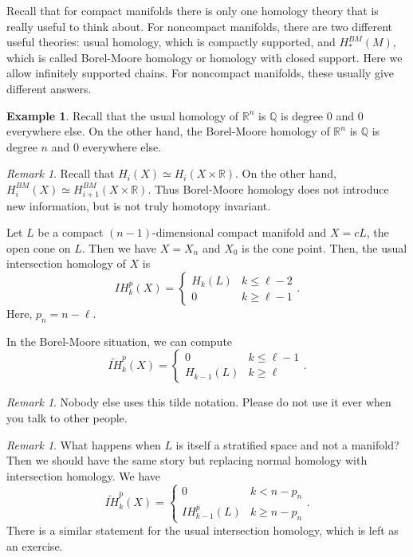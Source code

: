 \documentclass[leqno, openany]{memoir}
\theoremstyle{definition}
\newtheorem{exm}[thm]{Example}
\theoremstyle{remark}
\newtheorem{rmk}[thm]{Remark}
\theoremstyle{plain}
\theoremstyle{definition}
\theoremstyle{remark}
\newcommand{\R}{\mathbb{R}}
\newcommand{\Q}{\mathbb{Q}}
\begin{document}
Recall that for compact manifolds there is only one homology theory that is
really useful to think about. For noncompact manifolds, there are two different
useful theories: usual homology, which is compactly supported, and
$H_*^{BM}(M)$, which is called Borel-Moore homology or homology with closed
support. Here we allow infinitely supported chains. For noncompact manifolds,
these usually give different answers.

\begin{exm} Recall that the usual homology of $\R^n$ is $\Q$ is degree $0$ and
$0$ everywhere else. On the other hand, the Borel-Moore homology of $\R^n$ is
$\Q$ is degree $n$ and $0$ everywhere else.  \end{exm}

\begin{rmk} Recall that $H_i(X) \simeq H_i(X \times \R)$. On the other hand,
$H_i^{BM}(X) \simeq H_{i+1}^{BM}(X \times \R)$. Thus Borel-Moore homology does
not introduce new information, but is not truly homotopy invariant.  \end{rmk}

Let $L$ be a compact $(n-1)$-dimensional compact manifold and $X = cL$, the
open cone on $L$. Then we have $X = X_n$ and $X_0$ is the cone point. Then, the
usual intersection homology of $X$ is \[ IH_k^{\overline{p}}(X) = \begin{cases}
    H_k(L) & k \leq \ell - 2 \\ 0 & k \geq \ell - 1 \end{cases}. \] Here, $p_n
    = n - \ell$.

In the Borel-Moore situation, we can compute \[
    \widetilde{IH}_k^{\overline{p}}(X) = \begin{cases} 0 & k \leq \ell - 1 \\
        H_{k-1}(L) & k \geq \ell \end{cases}. \] \begin{rmk} Nobody else uses
        this tilde notation. Please do not use it ever when you talk to other
        people.  \end{rmk}

\begin{rmk} What happens when $L$ is itself a stratified space and not a
    manifold? Then we should have the same story but replacing normal homology
    with intersection homology. We have \[ \widetilde{IH}_k^{\overline{p}}(X) =
        \begin{cases} 0 & k < n - p_n \\ IH_{k-1}^{\overline{p}}(L) & k \geq n
        - p_n \end{cases}. \] There is a similar statement for the usual
    intersection homology, which is left as an exercise.  \end{rmk}
\end{document}
